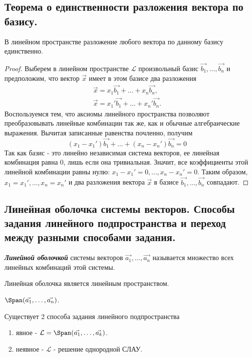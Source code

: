 \newpage


\subsection{
    Теорема о единственности разложения вектора по базису.
}

\begin{theorem}
    В линейном пространстве разложение любого вектора по данному базису единственно.
    \label{thm:theorem_2_3}
\end{theorem}

\begin{proof}
    Выберем в линейном пространстве $\mathcal{L}$ произвольный базис $\vec{b_1}, \ldots, \vec{b_n}$ и предположим, что вектор $\vec{x}$ имеет в этом базисе два разложения
    \begin{align*}
        \vec{x} = x_1\vec{b_1} + \ldots + x_n\vec{b_n},\\
        \vec{x} = x_1'\vec{b_1} + \ldots + x_n'\vec{b_n}.
    \end{align*}
    Воспользуемся тем, что аксиомы линейного пространства позволяют преобразовывать линейные комбинации так же, как и обычные алгебраические выражения. Вычитая записанные равенства почленно, получим
    $$(x_1 - x_1')\vec{b_1} + \ldots + (x_n - x_n')\vec{b_n} = 0$$
    Так как базис - это линейно независимая система векторов, ее линейная комбинация равна $0$, лишь если она тривиальная. Значит, все коэффициенты этой линейной комбинации равны нулю: $x_1 - x_1' = 0, \ldots, x_n - x_n' = 0$. Таким образом, $x_1 = x_1', \ldots, x_n = x_n'$ и два разложения вектора $\vec{x}$ в базисе $\vec{b_1}, \ldots, \vec{b_n}$ совпадают.
\end{proof}


\newpage


\subsection{
    Линейная оболочка системы векторов. Способы задания линейного подпространства и переход между разными способами задания.
}

\begin{definition}
    \textbf{\textit{Линейной оболочкой}} системы векторов $\vec{a_1}, \ldots, \vec{a_n}$ называется множество всех линейных комбинаций этой системы.
\end{definition}

\begin{theorem}
    Линейная оболочка является линейным пространством.
\end{theorem}

\begin{designation}
    $\Span(\vec{a_1}, \ldots, \vec{a_n})$.
\end{designation}

Существует 2 способа задания линейного подпространства

\begin{enumerate}
    \item явное - $\mathcal{L} = \Span(\vec{a_1}, \ldots, \vec{a_k})$.
    \item неявное - $\mathcal{L}$ - решение однородной СЛАУ.
\end{enumerate}